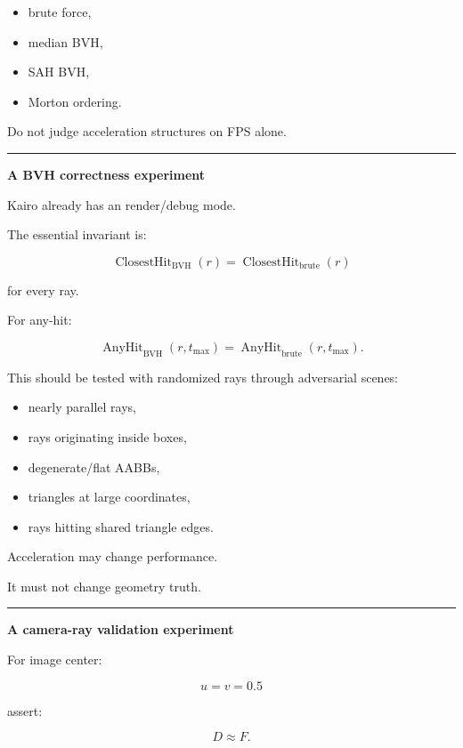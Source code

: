 \begin{itemize}
\tightlist
\item
  brute force,
\item
  median BVH,
\item
  SAH BVH,
\item
  Morton ordering.
\end{itemize}

Do not judge acceleration structures on FPS alone.

\begin{center}\rule{0.5\linewidth}{0.5pt}\end{center}

\textbf{A BVH correctness experiment}

Kairo already has an  render/debug mode.

The essential invariant is:

\[
\boxed{
\operatorname{ClosestHit}_{\text{BVH}}(r)
=
\operatorname{ClosestHit}_{\text{brute}}(r)
}
\]

for every ray.

For any-hit:

\[
\boxed{
\operatorname{AnyHit}_{\text{BVH}}(r,t_{\max})
=
\operatorname{AnyHit}_{\text{brute}}(r,t_{\max}).
}
\]

This should be tested with randomized rays through adversarial scenes:

\begin{itemize}
\tightlist
\item
  nearly parallel rays,
\item
  rays originating inside boxes,
\item
  degenerate/flat AABBs,
\item
  triangles at large coordinates,
\item
  rays hitting shared triangle edges.
\end{itemize}

Acceleration may change performance.

It must not change geometry truth.

\begin{center}\rule{0.5\linewidth}{0.5pt}\end{center}

\textbf{A camera-ray validation experiment}

For image center:

\[
u=v=0.5
\]

assert:

\[
D\approx F.
\]

